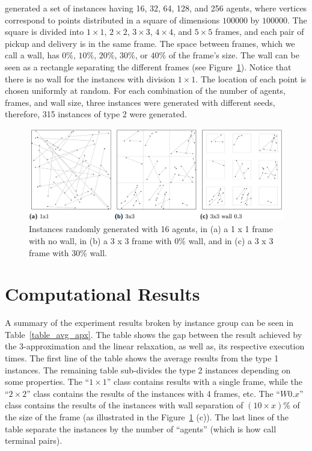 \cite{Pereira2018TheSM} generated a set of instances having 16, 32, 64, 128, and 256 agents, where vertices correspond to points distributed in a square of dimensions \(100000\) by \(100000\). The square is divided into \(1 \times 1\), \(2 \times 2\), \(3 \times 3\), \(4 \times 4\), and \(5 \times 5\) frames, and each pair of pickup and delivery is in the same frame. The space between frames, which we call a wall, has \(0\%\), \(10\%\), \(20\%\), \(30\%\), or \(40\%\) of the frame’s size. The wall can be seen as a rectangle separating the different frames (see Figure~\ref{fig:instances_type_2}). Notice that there is no wall for the instances with division \(1 \times 1\). The location of each point is chosen uniformly at random. For each combination of the number of agents, frames, and wall size, three instances were generated with different seeds, therefore, 315 instances of type 2 were generated.

\begin{figure}[H]
    \centering
    \includegraphics[scale=0.5]{imgs/instances_type_2.png}
    \caption{Instances randomly generated with 16 agents, in (a) a 1 x 1 frame with no wall, in (b) a 3 x 3 frame with \(0\%\) wall, and in (c) a 3 x 3 frame with \(30\%\) wall.}
    \label{fig:instances_type_2}
\end{figure}

\section{Computational Results}

A summary of the experiment results broken by instance group can be seen in Table~\ref{table_avg_apx}. The table shows the gap between the result achieved by the 3-approximation and the linear relaxation, as well as, its respective execution times. The first line of the table shows the average results from the type 1 instances. The remaining table sub-divides the type 2 instances depending on some properties. The ``\(1 \times 1\)'' class contains results with a single frame, while the ``\(2 \times 2\)'' class contains the results of the instances with 4 frames, etc. The ``\(W0.x\)'' class contains the results of the instances with wall separation of \((10 \times x)\%\) of the size of the frame (as illustrated in the Figure~\ref{fig:instances_type_2} (c)). The last lines of the table separate the instances by the number of ``agents'' (which is how \citeauthor{Pereira2018TheSM} call terminal pairs).


